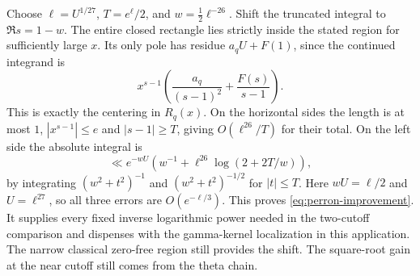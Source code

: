 Choose $\ell=U^{1/27}$, $T=e^\ell/2$, and $w=\tfrac12\ell^{-26}$.
Shift the truncated integral to $\Re s=1-w$. The entire closed
rectangle lies strictly inside the stated region for sufficiently large
$x$. Its only pole has residue $a_q U+F(1)$, since the continued
integrand is
\[
        x^{s-1}\left(\frac{a_q}{(s-1)^2}
                       +\frac{F(s)}{s-1}\right).
\]
This is exactly the centering in $R_q(x)$. On the horizontal sides the
length is at most $1$, $|x^{s-1}|\le e$ and $|s-1|\ge T$, giving
$O(\ell^{26}/T)$ for their total. On the left side the absolute integral is
\[
 \ll e^{-wU}\left(w^{-1}+\ell^{26}\log(2+2T/w)\right),
\]
by integrating $(w^2+t^2)^{-1}$ and $(w^2+t^2)^{-1/2}$ for
$|t|\le T$. Here $wU=\ell/2$ and $U=\ell^{27}$, so all three errors
are $O(e^{-\ell/3})$. This proves \eqref{eq:perron-improvement}.
It supplies every fixed inverse logarithmic power needed in the
two-cutoff comparison and dispenses with the gamma-kernel localization
in this application. The narrow classical zero-free region still
provides the shift. The square-root gain at the near cutoff still comes
from the theta chain.
